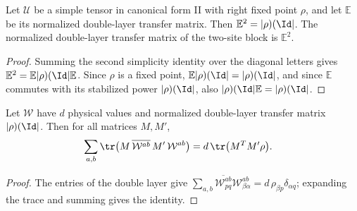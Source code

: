 \begin{lemma}
    \label{lem:mpu_double_layer_square_fixed_pair}
    \leanok
    Let $\mathcal U$ be a simple tensor in canonical form II with right fixed
    point $\rho$, and let $\mathbb E$ be its normalized double-layer transfer
    matrix. Then $\mathbb E^2=|\rho)(\Id|$. The normalized double-layer
    transfer matrix of the two-site block is $\mathbb E^2$.
\end{lemma}

\begin{proof}
    \leanok
    Summing the second simplicity identity over the diagonal letters gives
    $\mathbb E^2=\mathbb E|\rho)(\Id|\mathbb E$. Since $\rho$ is a fixed point,
    $\mathbb E|\rho)(\Id|=|\rho)(\Id|$, and since $\mathbb E$ commutes with
    its stabilized power $|\rho)(\Id|$, also $|\rho)(\Id|\mathbb E=|\rho)(\Id|$.
\end{proof}

\begin{lemma}
    \label{lem:mpu_twisted_trace_rank_one}
    \leanok
    Let $\mathcal W$ have $d$ physical values and normalized double-layer
    transfer matrix $|\rho)(\Id|$. Then for all matrices $M,M'$,
    \begin{align}
        \sum_{a,b}\tr\bigl(M\,\overline{\mathcal W^{ab}}\,M'\,\mathcal W^{ab}\bigr)
         & =d\,\tr\bigl(M^TM'\rho\bigr).
    \end{align}
\end{lemma}

\begin{proof}
    \leanok
    The entries of the double layer give
    $\sum_{a,b}\overline{\mathcal W^{ab}_{pq}}\mathcal W^{ab}_{\beta\alpha}
        =d\,\rho_{\beta p}\delta_{\alpha q}$; expanding the trace and summing
    gives the identity.
\end{proof}

